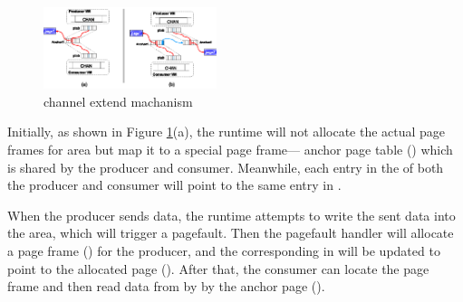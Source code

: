 \begin{figure}[!h!t]  
	\centering
	\includegraphics[width=0.45\textwidth]{eps/chan_extend.eps}
	\caption{channel extend machanism}
	\label{fig:spmckern:extend}
\end{figure}

Initially, as shown in Figure \ref{fig:spmckern:extend}(a), the runtime will not allocate the actual page frames for  area but map it to a special page frame--- anchor page table () which is shared by the producer and consumer.
Meanwhile, each entry in the  of both the producer and consumer will point to the same entry in . 

When the producer sends data, the runtime attempts to write the sent data into the  area, which will trigger a pagefault. 
Then the pagefault handler will allocate a page frame () for the producer, and the corresponding  in  will be updated to point to the allocated page (). 
After that, the consumer can locate the page frame   and then read data from  by by the anchor page ().


